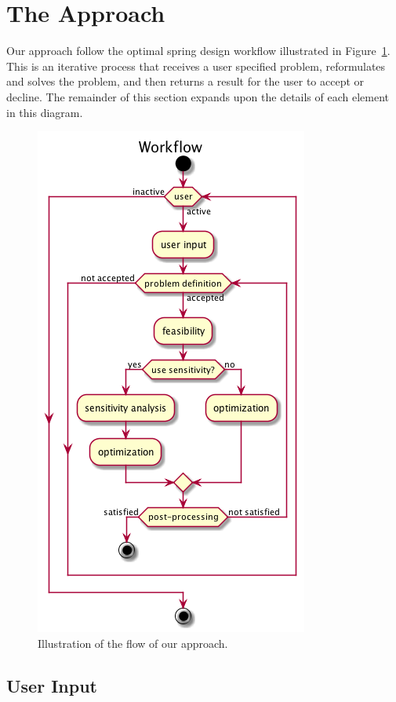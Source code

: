 \documentclass[10pt]{article}
\begin{document}
\section{The Approach}
\label{sec:The_Approach}

Our approach follow the optimal spring design workflow illustrated in Figure~\ref{Workflow}. This is an iterative process that receives a user specified problem, reformulates and solves the problem, and then returns a result for the user to accept or decline. The remainder of this section expands upon the details of each element in this diagram.

		\begin{figure}[h!]
		 \begin{center}\includegraphics[scale=.4]{IMSM_Workflow.png}\end{center}
		 \caption{Illustration of the flow of our approach.}
		 \label{Workflow}
		 
		 \end{figure}

\subsection{User Input}
\label{subsec:User_Input}
\end{document}
